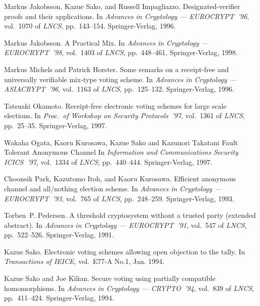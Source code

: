 \documentclass{article}
\begin{document}
\begin{thebibliography}{[CDNO97]}
Markus Jakobsson, Kazue Sako, and Russell Impagliazzo.
\newblock Designated-verifier proofs and their applications.
\newblock In {\em Advances in Cryptology --- {EUROCRYPT}~'96},
  vol.~1070 of {\em LNCS}, pp.~143--154.
  {Springer-Verlag}, 1996.

Markus Jakobsson.
\newblock A Practical Mix.
\newblock In {\em Advances in Cryptology --- {EUROCRYPT}~'98},
  vol.~1403 of {\em LNCS}, pp.~448--461,
  {Springer-Verlag}, 1998.

Markus Michels and Patrick Horster.
\newblock Some remarks on a receipt-free and universally verifiable
  mix-type voting scheme.
\newblock In {\em Advances in Cryptology --- {ASIACRYPT}~'96},
  vol.~1163 of {\em LNCS}, pp.~125--132.
  {Springer-Verlag}, 1996.

Tatsuaki Okamoto.
\newblock Receipt-free electronic voting schemes for large scale
  elections.
\newblock In {\em Proc.~of Workshop on Security Protocols~'97},
  vol.~1361 of {\em LNCS}, pp.~25--35.
  {Springer-Verlag}, 1997.

Wakaha Ogata, Kaoru Kurosawa, Kazue Sako and Kazunori Takatani
\newblock Fault Tolerant Anonymous Channel
\newblock In {\em Information and Communications Security {ICICS}~'97},
  vol.~1334 of {\em LNCS}, pp.~440--444.
  {Springer-Verlag}, 1997.

Choonsik Park, Kazutomo Itoh, and Kaoru Kurosawa.
\newblock Efficient anonymous channel and all/nothing election scheme.
\newblock In {\em Advances in Cryptology --- {EUROCRYPT}~'93},
  vol.~765 of {\em LNCS}, pp.~248--259.
  {Springer-Verlag}, 1993.

Torben~P. Pedersen.
\newblock A threshold cryptosystem without a trusted party (extended
  abstract).
\newblock In {\em Advances in Cryptology --- {EUROCRYPT}~'91},
  vol.~547 of {\em LNCS}, pp.~522--526.
  {Springer-Verlag}, 1991.

Kazue Sako.
\newblock Electronic voting schemes allowing open objection to the tally.
\newblock In {\em Transactions of IEICE,} vol.~E77-A No.1, Jan.
  1994.

Kazue Sako and Joe Kilian.
\newblock Secure voting using partially compatible homomorphisms.
\newblock In {\em Advances in Cryptology --- {CRYPTO}~'94}, vol.~839
  of {\em LNCS}, pp.~411--424.
  {Springer-Verlag}, 1994.


\end{thebibliography}
\end{document}
